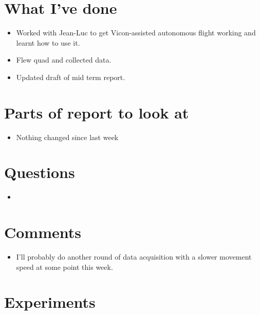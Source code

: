 \documentclass[12pt,a4paper]{article}
\begin{document}
\author{Katrina Ashton}


\pagestyle{fancy}
\fancyhf{}
\rhead{\thepage}

\section{What I've done}
\begin{itemize}
\item{Worked with Jean-Luc to get Vicon-assisted autonomous flight working and learnt how to use it.}
\item{Flew quad and collected data.}
\item{Updated draft of mid term report.}
\end{itemize}

\section{Parts of report to look at}
\begin{itemize}
\item{Nothing changed since last week}
\end{itemize}

\section{Questions}
\begin{itemize}
\item
\end{itemize}

\section{Comments}
\begin{itemize}
\item I'll probably do another round of data acquisition with a slower movement speed at some point this week.
\end{itemize}

\section{Experiments}
\end{document}
